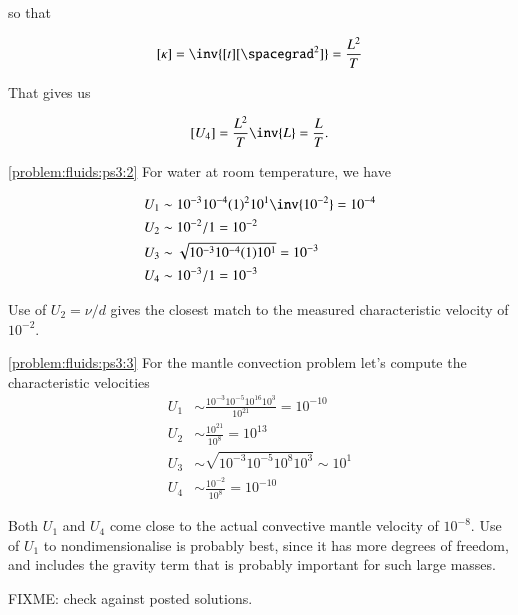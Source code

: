 \begin{Answer}[ref={problem:fluids:ps3}]
\begin{enumerate}
so that 

\begin{equation}\label{eqn:continuumProblemSet3:150}
[\kappa] = \inv{[t][\spacegrad^2]} = \frac{L^2}{T}
\end{equation}

That gives us

\begin{equation}\label{eqn:continuumProblemSet3:170}
[U_4] = \frac{L^2}{T} \inv{L} = \frac{L}{T}.
\end{equation}
\end{enumerate}


\ref{problem:fluids:ps3:2} For water at room temperature, we have

\begin{align}\label{eqn:continuumProblemSet3:190}
U_1 &\sim 10^{-3} 10^{-4} (1)^2 10^1 \inv{10^{-2}} = 10^{-4} \\
U_2 &\sim 10^{-2}/1 = 10^{-2} \\
U_3 &\sim \sqrt{ 10^{-3} 10^{-4} (1) 10^1 } = 10^{-3} \\
U_4 &\sim 10^{-3}/1 = 10^{-3}
\end{align}

Use of $U_2 = \nu/d$ gives the closest match to the measured characteristic velocity of $10^{-2}$.

\ref{problem:fluids:ps3:3} For the mantle convection problem let's compute the characteristic velocities
\begin{align}\label{eqn:continuumProblemSet3:210}
U_1 &\sim \frac{10^{-3} 10^{-5} 10^{16} 10^3 }{10^{21}} = 10^{-10} \\
U_2 &\sim \frac{10^{21}}{10^8} = 10^{13} \\
U_3 &\sim \sqrt{ 10^{-3} 10^{-5} 10^8 10^3 } \sim 10^1 \\
U_4 &\sim \frac{10^{-2}}{10^8} = 10^{-10}
\end{align}

Both $U_1$ and $U_4$ come close to the actual convective mantle velocity of $10^{-8}$.  Use of $U_1$ to nondimensionalise is probably best, since it has more degrees of freedom, and includes the gravity term that is probably important for such large masses.

FIXME: check against posted solutions.
\end{Answer}

